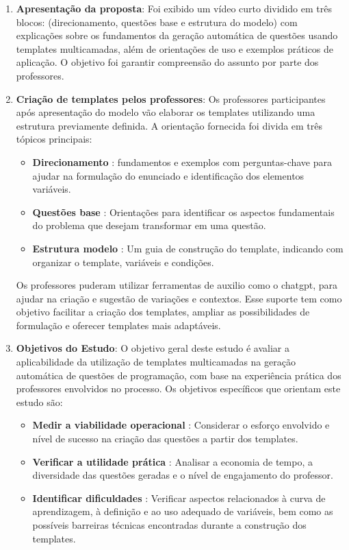 \begin{enumerate}
    \item \textbf{Apresentação da proposta}:  Foi exibido um vídeo curto dividido em três blocos: (direcionamento, questões base e estrutura do modelo) com explicações sobre os fundamentos da geração automática de questões usando templates multicamadas, além de orientações de uso e exemplos práticos de aplicação. O objetivo foi garantir  compreensão do assunto por parte dos professores.
    
    \item \textbf{Criação de templates pelos professores}:  Os professores participantes após apresentação do modelo vão elaborar os templates utilizando uma estrutura previamente definida. A orientação fornecida foi divida em três tópicos principais:
    \begin{itemize}
        \item \textbf{Direcionamento} : fundamentos e exemplos com perguntas-chave para ajudar na formulação do enunciado e identificação dos elementos variáveis.
        \item \textbf{Questões base} : Orientações para identificar os aspectos fundamentais do problema que desejam transformar em uma questão.
        \item \textbf{Estrutura modelo} : Um guia de construção do template, indicando com organizar o template, variáveis e condições.
    \end{itemize}

Os professores puderam utilizar ferramentas de auxilio como o \gls{chatgpt}, para ajudar na criação e sugestão de variações e contextos. Esse suporte tem como objetivo facilitar a criação dos templates, ampliar as possibilidades de formulação e oferecer templates mais adaptáveis.

    \item \textbf{Objetivos do Estudo}:  O objetivo geral deste estudo é avaliar a aplicabilidade da utilização de templates multicamadas na geração automática de questões de programação, com base na experiência prática dos professores envolvidos no processo. Os objetivos específicos que orientam este estudo são:

       \begin{itemize}
        \item \textbf{Medir a viabilidade operacional} : Considerar  o esforço envolvido e nível de sucesso na criação das questões a partir dos templates.
        \item \textbf{Verificar a utilidade prática} : Analisar a economia de tempo, a diversidade das questões geradas e o nível de engajamento do professor.
        \item \textbf{Identificar dificuldades} : Verificar aspectos relacionados à curva de aprendizagem, à definição e ao uso adequado de variáveis, bem como as possíveis barreiras técnicas encontradas durante a construção dos templates. 
    \end{itemize}
    

\end{enumerate}
